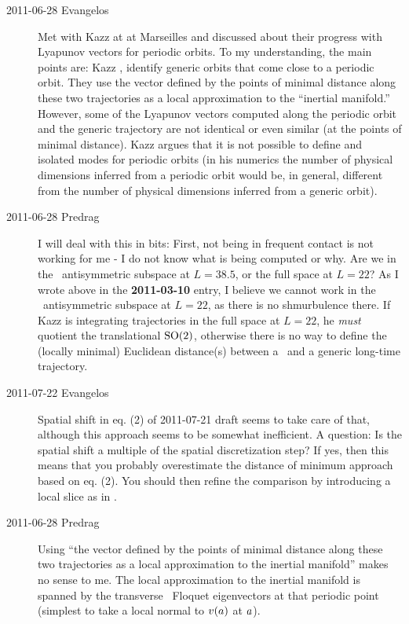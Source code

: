 \begin{description}
\item[2011-06-28 Evangelos]
  Met with Kazz at 
  at Marseilles and discussed about their progress with Lyapunov vectors
  for periodic orbits. To my understanding, the main points are: Kazz
  \etal, identify generic orbits that come close to a periodic orbit. They
  use the vector defined by the points of minimal distance along these two
  trajectories as a local approximation to the ``inertial manifold.''
  However, some of the Lyapunov vectors computed along the periodic orbit
  and the generic trajectory are not identical or even similar (at the
  points of minimal distance). Kazz argues that it is not possible to
  define {\entangled} and isolated modes for periodic orbits (in his numerics
  the number of physical dimensions inferred from a periodic orbit would
  be, in general, different from the number of physical dimensions inferred
  from a generic orbit).

\item[2011-06-28 Predrag] I will deal with this in bits:
  First, not being in frequent contact is not working for me - I
  do not know what is being computed or why. Are we in the \KS\
  antisymmetric subspace at $L = 38.5$, or the
  full space at $L=22$? As I wrote above in the {\bf 2011-03-10}
  entry, I believe we cannot work in the \KS\ antisymmetric
  subspace at $L=22$, as there is no shmurbulence there. If Kazz
  is integrating trajectories in the full space at $L=22$, he
  \emph{must} quotient the translational $\textrm{SO}(2)$, otherwise
  there is no way to define the (locally minimal) Euclidean
  distance(s) between a \po\ and a generic long-time trajectory.

\item[2011-07-22 Evangelos] Spatial shift in eq. (2) of 2011-07-21 draft seems
  to take care of that, although this approach seems to be somewhat inefficient.
  A question: Is the spatial shift a multiple of the spatial discretization step?
  If yes, then this means that you probably overestimate the distance of minimum
  approach based on eq. (2). You should then refine the comparison by introducing
  a local slice as in \refrefs{SiCvi10,FrCv11}.


\item[2011-06-28 Predrag]
  Using ``the vector defined by the points of minimal distance along these two
  trajectories as a local approximation to the inertial manifold'' makes no sense to me.
  The local approximation to the inertial manifold is spanned by the transverse
  \po\ Floquet eigenvectors at that periodic point (simplest to take a local {\PoincSec}
  normal to $v(a)$ at $a$).


\end{description}
